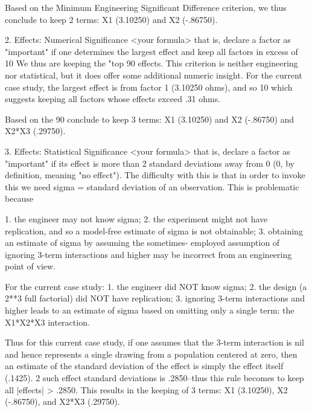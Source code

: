    Based on the Minimum Engineering Significant
   Difference criterion, we thus conclude to keep
   2 terms: X1 (3.10250) and X2 (-.86750).

2. Effects: Numerical Significance
   <your formula>
   that is, declare a factor as "important" if
   one determines the largest effect and keep
   all factors in excess of 10%
   We thus are keeping the "top 90%
   effects.  This criterion is neither engineering
   nor statistical, but it does offer some
   additional numeric insight.  For the current
   case study, the largest effect is from factor 1
   (3.10250 ohms), and so 10%
   which suggests keeping all factors whose
   effects exceed .31 ohms.

   Based on the 90%
   conclude to keep 3 terms:  X1 (3.10250) and X2 (-.86750)
   and X2*X3 (.29750).

3. Effects: Statistical Significance
   <your formula>
   that is, declare a factor as "important" if its
   effect is more than 2 standard deviations away
   from 0 (0, by definition, meaning "no effect").
   The difficulty with this is that in order to
   invoke this we need sigma = standard deviation
   of an observation.  This is problematic because

      1. the engineer may not know sigma;
      2. the experiment might not have
         replication, and so a model-free estimate
         of sigma is not obtainable;
      3. obtaining an estimate of sigma by
         assuming the sometimes- employed
         assumption of ignoring 3-term
         interactions and higher may be incorrect
         from an engineering point of view.

   For the current case study:
      1. the engineer did NOT know sigma;
      2. the design (a 2**3 full factorial) did NOT
         have replication;
      3. ignoring 3-term interactions and higher
         leads to an estimate of sigma based on
         omitting only a single term: the X1*X2*X3
         interaction.

   Thus for this current case study, if one
   assumes that the 3-term interaction is nil and
   hence represents a single drawing from a
   population centered at zero, then an estimate
   of the standard deviation of the effect is
   simply the effect itself (.1425).  2 such
   effect standard deviations is .2850--thus this
   rule becomes to keep all |effects| > .2850.  This
   results in the keeping of 3 terms: X1 (3.10250),
   X2 (-.86750), and X2*X3 (.29750).

